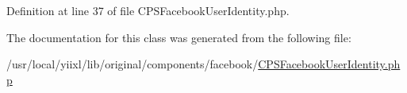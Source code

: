 Definition at line 37 of file CPSFacebookUserIdentity.php.



The documentation for this class was generated from the following file:\begin{DoxyCompactItemize}
\item 
/usr/local/yiixl/lib/original/components/facebook/\hyperlink{CPSFacebookUserIdentity_8php}{CPSFacebookUserIdentity.php}\end{DoxyCompactItemize}
